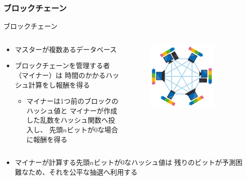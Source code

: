 \begin{frame}
  \frametitle{ブロックチェーン}
 
  \begin{block}{ブロックチェーン}
    \begin{columns}
      \begin{column}{0.8\textwidth}
        \begin{itemize}
          \item マスターが複数あるデータベース
          
          \item ブロックチェーンを管理する者（マイナー）は
          時間のかかるハッシュ計算をし報酬を得る
          \begin{itemize}
            \item マイナーは1つ前のブロックのハッシュ値と
            マイナーが作成した乱数をハッシュ関数へ投入し、
            先頭$n$ビットが$0$な場合に報酬を得る
          \end{itemize}
        \end{itemize}
      \end{column}
      \begin{column}{0.2\textwidth}
        \begin{center}
          \begin{figure}[h]
            \includegraphics[width=0.8\textwidth]{img/network_blockchain.png}
          \end{figure}
        \end{center}
      \end{column}
    \end{columns}
  \end{block}
  
  \begin{itemize}
    \item マイナーが計算する先頭$n$ビットが$0$なハッシュ値は
    残りのビットが予測困難なため、それを公平な抽選へ利用する
  \end{itemize}
\end{frame}
 

